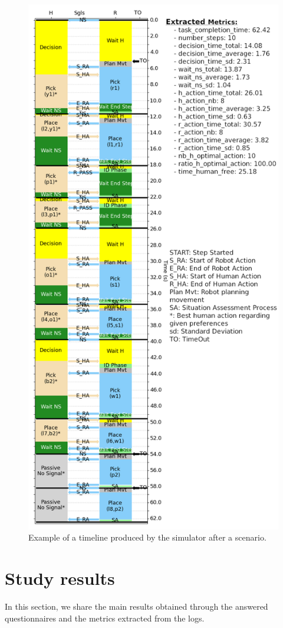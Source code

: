 \begin{figure}
    \centering
    \includegraphics[width=0.73\linewidth]{images/Chapter5/timeline_example.png}
    \caption{Example of a timeline produced by the simulator after a scenario.}
    \label{fig:timeline_example}
\end{figure}





\section{Study results}


In this section, we share the main results obtained through the answered questionnaires and the metrics extracted from the logs.

